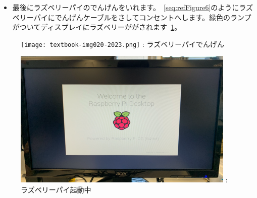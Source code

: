 \documentclass[a4paper,12pt]{jarticle}
\begin{document}
\begin{enumerate}
\begin{enumerate}
        \begin{itemize}
          \item
                最後にラズベリーパイのでんげんをいれます。~\ref{seq:refFigure6}のようにラズベリーパイにでんげんケーブルをさしてコンセントへします。緑色のランプがついてディスプレイにラズベリーががされます~\ref{seq:refFigure7}。
        \end{itemize}
        \begin{figure}
          \centering
          \begin{minipage}{0.4\textwidth}
            {\upshape
              \texttt{[image: textbook-img020-2023.png]}
              \newline
              {\theFigure\label{seq:refFigure6}}:
              ラズベリーパイでんげん}
          \end{minipage}
          \begin{minipage}{0.4\textwidth}
            {\upshape
              \includegraphics[width=.9\linewidth]{textbook-img0212023.png}
              \newline
              {\theFigure\label{seq:refFigure7}}:
              ラズベリーパイ起動中}
            \end{minipage}
          \end{figure}

\clearpage
\end{enumerate}




\end{enumerate}
\end{document}
